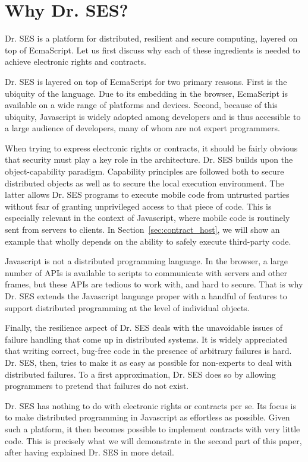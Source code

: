 \documentclass{llncs}
\begin{document}
\section{Why Dr. SES?}

Dr. SES is a platform for distributed, resilient and secure computing, layered on top of EcmaScript. Let us first discuss why each of these ingredients is needed to achieve electronic rights and contracts.

Dr. SES is layered on top of EcmaScript for two primary reasons. First is the ubiquity of the language. Due to its embedding in the browser, EcmaScript is available on a wide range of platforms and devices. Second, because of this ubiquity, Javascript is widely adopted among developers and is thus accessible to a large audience of developers, many of whom are not expert programmers.

When trying to express electronic rights or contracts, it should be fairly obvious that security must play a key role in the architecture. Dr. SES builds upon the object-capability paradigm. Capability principles are followed both to secure distributed objects as well as to secure the local execution environment. The latter allows Dr. SES programs to execute mobile code from untrusted parties without fear of granting unprivileged access to that piece of code. This is especially relevant in the context of Javascript, where mobile code is routinely sent from servers to clients. In Section~\ref{sec:contract_host}, we will show an example that wholly depends on the ability to safely execute third-party code.

Javascript is not a distributed programming language. In the browser, a large number of APIs is available to scripts to communicate with servers and other frames, but these APIs are tedious to work with, and hard to secure. That is why Dr. SES extends the Javascript language proper with a handful of features to support distributed programming at the level of individual objects.

Finally, the resilience aspect of Dr. SES deals with the unavoidable issues of failure handling that come up in distributed systems. It is widely appreciated that writing correct, bug-free code in the presence of arbitrary failures is hard. Dr. SES, then, tries to make it as easy as possible for non-experts to deal with distributed failures. To a first approximation, Dr. SES does so by allowing programmers to pretend that failures do not exist.

Dr. SES has nothing to do with electronic rights or contracts per se. Its focus is to make distributed programming in Javascript as effortless as possible. Given such a platform, it then becomes possible to implement contracts with very little code. This is precisely what we will demonstrate in the second part of this paper, after having explained Dr. SES in more detail.
\end{document}
